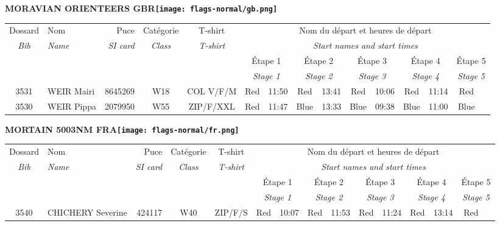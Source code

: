 \documentclass{report}
\begin{document}
\newpage
  \Huge \centering \bfseries MORAVIAN ORIENTEERS  GBR\normalfont \footnotesize \sffamily \hfill \texttt{[image: flags-normal/gb.png]} \newline 
  \begin{longtable}{|c|l|r|c|c|*{5}{cc|}}
    Dossard & Nom  & Puce    & Catégorie & T-shirt & \multicolumn{10}{c|}{Nom du départ et heures de départ} \\
    \itshape Bib     & \itshape Name & \itshape SI card & \itshape Class  & \itshape  T-shirt  & \multicolumn{10}{c|}{\itshape Start names and start times} \\
    \hline
    & & & & & \multicolumn{2}{c|}{Étape 1} & \multicolumn{2}{c|}{Étape 2} & \multicolumn{2}{c|}{Étape 3} & \multicolumn{2}{c|}{Étape 4} & \multicolumn{2}{c|}{Étape 5} \\
    & & & & & \multicolumn{2}{c|}{\itshape Stage 1} & \multicolumn{2}{c|}{\itshape Stage 2} & \multicolumn{2}{c|}{\itshape Stage 3} & \multicolumn{2}{c|}{\itshape Stage 4} & \multicolumn{2}{c|}{\itshape Stage 5} \\
    \hline
    3531 & WEIR Mairi & 8645269 & W18 & COL V/F/M & Red & 11:50 & Red & 13:41 & Red & 10:06 & Red & 11:14 & Red &  \\
    3530 & WEIR Pippa & 2079950 & W55 & ZIP/F/XXL & Red & 11:47 & Blue & 13:33 & Blue & 09:38 & Blue & 11:00 & Blue &  \\
  \end{longtable}
\newpage
  \Huge \centering \bfseries MORTAIN 5003NM FRA\normalfont \footnotesize \sffamily \hfill \texttt{[image: flags-normal/fr.png]} \newline 
  \begin{longtable}{|c|l|r|c|c|*{5}{cc|}}
    Dossard & Nom  & Puce    & Catégorie & T-shirt & \multicolumn{10}{c|}{Nom du départ et heures de départ} \\
    \itshape Bib     & \itshape Name & \itshape SI card & \itshape Class  & \itshape  T-shirt  & \multicolumn{10}{c|}{\itshape Start names and start times} \\
    \hline
    & & & & & \multicolumn{2}{c|}{Étape 1} & \multicolumn{2}{c|}{Étape 2} & \multicolumn{2}{c|}{Étape 3} & \multicolumn{2}{c|}{Étape 4} & \multicolumn{2}{c|}{Étape 5} \\
    & & & & & \multicolumn{2}{c|}{\itshape Stage 1} & \multicolumn{2}{c|}{\itshape Stage 2} & \multicolumn{2}{c|}{\itshape Stage 3} & \multicolumn{2}{c|}{\itshape Stage 4} & \multicolumn{2}{c|}{\itshape Stage 5} \\
    \hline
    3540 & CHICHERY Severine & 424117 & W40 & ZIP/F/S & Red & 10:07 & Red & 11:53 & Red & 11:24 & Red & 13:14 & Red &  \\
  \end{longtable}
\end{document}
